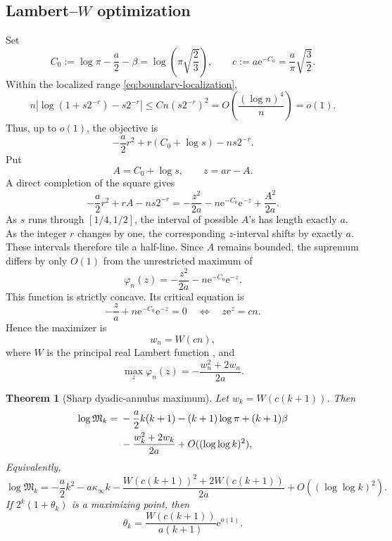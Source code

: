 \documentclass[11pt,oneside]{article}
\numberwithin{equation}{section}
\newtheorem{theorem}{Theorem}[section]
\theoremstyle{definition}
\theoremstyle{remark}
\newcommand{\e}{\mathrm e}
\newcommand{\LambertW}{W}
\newcommand{\defeq}{\mathrel{:=}}
\begin{document}
\subsection{Lambert--\texorpdfstring{\(W\)}{W} optimization}

Set
\begin{equation}
 C_0\defeq\log\pi-\frac a2-\beta
 =\log\!\left(\pi\sqrt{\frac23}\right),
 \qquad
 c\defeq a\e^{-C_0}=\frac a\pi\sqrt{\frac32}.
 \label{eq:C0-c}
\end{equation}
Within the localized range \eqref{eq:boundary-localization},
\[
 n\left|\log(1+s2^{-r})-s2^{-r}\right|
 \le Cn(s2^{-r})^2
 =O\!\left(\frac{(\log n)^4}{n}\right)=o(1).
\]
Thus, up to \(o(1)\), the objective is
\begin{equation}
 -\frac a2r^2+r(C_0+\log s)-ns2^{-r}.
 \label{eq:Fn-linearized}
\end{equation}
Put
\[
 A=C_0+\log s,
 \qquad z=ar-A.
\]
A direct completion of the square gives
\begin{equation}
 -\frac a2r^2+rA-ns2^{-r}
 =-\frac{z^2}{2a}-n\e^{-C_0}\e^{-z}+\frac{A^2}{2a}.
 \label{eq:z-objective}
\end{equation}
As \(s\) runs through \([1/4,1/2]\), the interval of possible \(A\)'s has length exactly
\(a\).  As the integer \(r\) changes by one, the corresponding \(z\)-interval shifts by
exactly \(a\).  These intervals therefore tile a half-line.  Since \(A\) remains bounded,
the supremum differs by only \(O(1)\) from the unrestricted maximum of
\begin{equation}
 \varphi_n(z)=-\frac{z^2}{2a}-n\e^{-C_0}\e^{-z}.
 \label{eq:phi-n}
\end{equation}
This function is strictly concave.  Its critical equation is
\[
 -\frac za+n\e^{-C_0}\e^{-z}=0
 \quad\Longleftrightarrow\quad
 z\e^z=cn.
\]
Hence the maximizer is
\begin{equation}
 w_n=\LambertW(cn),
 \label{eq:wn}
\end{equation}
where \(\LambertW\) is the principal real Lambert function \cite{corless-lambert}, and
\begin{equation}
 \max_z\varphi_n(z)
 =-\frac{w_n^2+2w_n}{2a}.
 \label{eq:phi-max}
\end{equation}

\begin{theorem}[Sharp dyadic-annulus maximum]
\label{thm:annular-main}
Let \(w_k=\LambertW(c(k+1))\).  Then
\begin{align}
 \log\mathfrak M_k
 ={}&-\frac a2k(k+1)-(k+1)\log\pi+(k+1)\beta\notag\\
 &-\frac{w_k^2+2w_k}{2a}
 +O((\log\log k)^2),
 \label{eq:annular-main}
\end{align}
Equivalently,
\begin{equation}
 \log\mathfrak M_k
 =-\frac a2k^2-a\kappa_\infty k
 -\frac{\LambertW(c(k+1))^2+2\LambertW(c(k+1))}{2a}
 +O((\log\log k)^2).
 \label{eq:annular-main-compact}
\end{equation}
If \(2^k(1+\theta_k)\) is a maximizing point, then
\begin{equation}
 \theta_k
 =\frac{\LambertW(c(k+1))}{a(k+1)}\e^{o(1)}.
 \label{eq:annular-location}
\end{equation}
\end{theorem}
\end{document}
